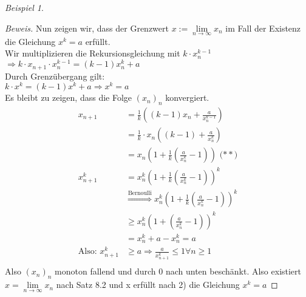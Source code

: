 \documentclass[12pt,a4paper,titlepage]{article} %
\theoremstyle{definition}
\theoremstyle{remark}
\newtheorem*{bsp}{Beispiel}
\newenvironment{bew}{\begin{proof}[Beweis]}{\end{proof}}
\newcommand{\limes}[1]{\lim\limits_{#1\rightarrow\infty}}
\begin{document}
\begin{bsp}
\begin{bew}
			Nun zeigen wir, dass der Grenzwert \(x := \limes{n} x_n\) im Fall der Existenz die Gleichung \(x^k = a\) erfüllt.\\
			Wir multiplizieren die Rekursionsgleichung mit \(k \cdot x_n^{k-1}\)\\
			\(\Rightarrow k \cdot x_{n+1} \cdot x_n^{k-1} = (k-1)x_n^k + a\)\\
			Durch Grenzübergang gilt:\\
			\(k \cdot x^k = (k-1)x^k + a \Rightarrow x^k = a \)\\
			Es bleibt zu zeigen, dass die Folge \((x_n)_n\) konvergiert.
			\begin{align*}
				x_{n+1} &= \frac{1}{k}\left((k-1)x_n + \frac{a}{x_n^{k-1}}\right)\\
				&= \frac{1}{k} \cdot x_n \left((k-1) + \frac{a}{x_n^{k}}\right)\\
				&= x_n \left(1 + \frac{1}{k}\left(\frac{a}{x_n^k} - 1\right)\right) \text{ (\(\ast \ast\))}\\
				x_{n+1}^k &= x_n^k\left(1+\frac{1}{k}\left(\frac{a}{x_n^k} - 1 \right)\right)^k\\
				&\overset{\text{Bernoulli}}{\Rightarrow} x_n^k\left(1+\frac{1}{k}\left(\frac{a}{x_n^k} - 1 \right)\right)^k\\
				&\geq x_n^k\left(1+\left(\frac{a}{x_n^k} - 1 \right)\right)^k\\
				&= x_n^k + a - x_n^k = a\\
				\text{Also: } x_{n+1}^k &\geq a \Rightarrow \frac{a}{x_{n+1}^k} \leq 1 \forall n \geq 1\\
			\end{align*}
			Also \((x_n)_n\) monoton fallend und durch 0 nach unten beschänkt. Also existiert \(x = \limes{n} x_n\) nach Satz 8.2 und x erfüllt nach 2) die Gleichung \(x^k = a\)
		\end{bew}
	\end{bsp}
\end{document}
